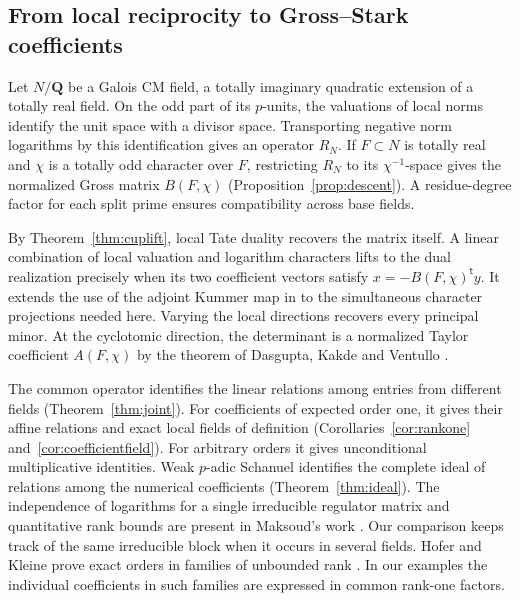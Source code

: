\documentclass[11pt]{amsart}
\numberwithin{equation}{section}
\theoremstyle{definition}
\theoremstyle{remark}
\newcommand{\Q}{\mathbf Q}
\begin{document}
\subsection*{From local reciprocity to Gross--Stark coefficients}
Let $N/\Q$ be a Galois CM field, a totally imaginary quadratic
extension of a totally real field. On the odd part of its
$p$-units, the valuations of local norms identify the unit space
with a divisor space. Transporting negative norm logarithms by this
identification gives an operator $R_N$. If $F\subset N$ is totally
real and $\chi$ is a totally odd character over $F$, restricting
$R_N$ to its $\chi^{-1}$-space gives the normalized Gross matrix
$B(F,\chi)$ (Proposition~\ref{prop:descent}). A residue-degree
factor for each split prime ensures compatibility across base fields.

By Theorem~\ref{thm:cuplift}, local Tate duality recovers the
matrix itself. A linear combination of local valuation and logarithm
characters lifts to the dual realization precisely when its two
coefficient vectors satisfy $x=-B(F,\chi)^{\mathsf t}y$.
It extends the use of the adjoint Kummer map in
\cite[eq.~(2.3), Prop.~7.5]{MohajerSemistable} to the simultaneous
character projections needed here. Varying the local directions
recovers every principal minor. At the cyclotomic direction,
the determinant is a normalized Taylor coefficient $A(F,\chi)$
by the theorem of Dasgupta, Kakde and Ventullo \cite{DKV}.

The common operator identifies the linear relations among entries
from different fields (Theorem~\ref{thm:joint}). For coefficients
of expected order one, it gives their affine relations and exact
local fields of definition
(Corollaries~\ref{cor:rankone} and~\ref{cor:coefficientfield}).
For arbitrary orders it gives unconditional multiplicative
identities. Weak $p$-adic Schanuel identifies the complete ideal of
relations among the numerical coefficients
(Theorem~\ref{thm:ideal}). The independence of logarithms for a
single irreducible regulator matrix and quantitative rank bounds
are present in Maksoud's work \cite[Thms.~1.5, 4.3]{Maksoud}.
Our comparison keeps track of the same irreducible block when it
occurs in several fields. Hofer and Kleine prove exact orders in
families of unbounded rank \cite{HK}. In our examples the individual
coefficients in such families are expressed in common rank-one
factors.
\end{document}
